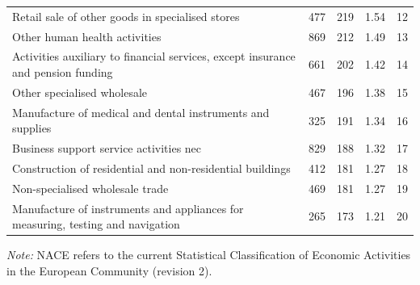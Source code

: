 \begin{table}[tpb]
{{\begin{threeparttable}
\begin{tabular}{lcccc}
Retail sale of other goods in specialised stores & 	 477 & 	 219 & 	 1.54 & 	 12 \\ 
Other human health activities & 	 869 & 	 212 & 	 1.49 & 	 13 \\ 
Activities auxiliary to financial services, except insurance and pension funding & 	 661 & 	 202 & 	 1.42 & 	 14 \\ 
Other specialised wholesale & 	 467 & 	 196 & 	 1.38 & 	 15 \\ 
Manufacture of medical and dental instruments and supplies & 	 325 & 	 191 & 	 1.34 & 	 16 \\ 
Business support service activities nec & 	 829 & 	 188 & 	 1.32 & 	 17 \\ 
Construction of residential and non-residential buildings & 	 412 & 	 181 & 	 1.27 & 	 18 \\ 
Non-specialised wholesale trade & 	 469 & 	 181 & 	 1.27 & 	 19 \\ 
Manufacture of instruments and appliances for measuring, testing and navigation & 	 265 & 	 173 & 	 1.21 & 	 20 \\ 
\midrule
\bottomrule
\end{tabular}
        \begin{tablenotes}[flushleft]%
	\item \emph{Note:} NACE refers to the current Statistical Classification of Economic Activities in the European Community (revision 2).
	\end{tablenotes}
\end{threeparttable}}
}
\end{table}

